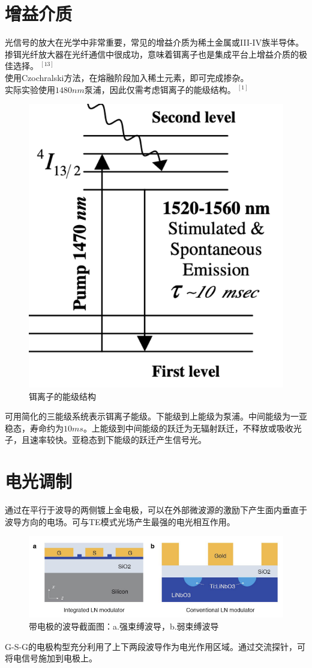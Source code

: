 \section{增益介质}
光信号的放大在光学中非常重要，常见的增益介质为稀土金属或III-IV族半导体。
掺铒光纤放大器在光纤通信中很成功，意味着铒离子也是集成平台上增益介质的极佳选择。$~^{[13]}$\\
使用Czochralski方法，在熔融阶段加入稀土元素，即可完成掺杂。\\
实际实验使用$1480nm$泵浦，因此仅需考虑铒离子的能级结构。$~^{[1]}$
\begin{figure}[htbp]
    \centering
    \includegraphics[width=0.5\linewidth]{figure/fig_27.png}
    \caption{铒离子的能级结构}
    \label{fig:enter-label}
\end{figure}
可用简化的三能级系统表示铒离子能级。下能级到上能级为泵浦。中间能级为一亚稳态，寿命约为$10ms$。上能级到中间能级的跃迁为无辐射跃迁，不释放或吸收光子，且速率较快。亚稳态到下能级的跃迁产生信号光。
\section{电光调制}
通过在平行于波导的两侧镀上金电极，可以在外部微波源的激励下产生面内垂直于波导方向的电场。可与TE模式光场产生最强的电光相互作用。\\
\begin{figure}[htbp]
    \centering
    \includegraphics[width=0.8\linewidth]{figure/fig_10.png}
    \caption{带电极的波导截面图：a.强束缚波导，b.弱束缚波导}
    \label{fig:enter-label}
\end{figure}
G-S-G的电极构型充分利用了上下两段波导作为电光作用区域。通过交流探针，可将电信号施加到电极上。